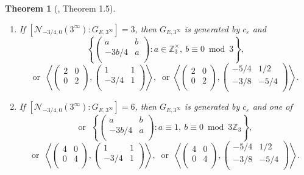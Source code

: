 \documentclass[11pt]{amsart}
\newtheorem{thm}[defn]{Theorem}
\theoremstyle{definition}
\newcommand{\Z}{\mathbb{Z}}
\begin{document}
\begin{thm}[\cite{lozano-galoiscm}, Theorem 1.5]
\begin{enumerate}
\begin{enumerate}
		\item[(ii)]  If $[\mathcal{N}_{-3/4,0}(3^\infty):G_{E,3^\infty}]=3$, then $G_{E,3^\infty}$ is generated by $c_{\varepsilon}$ and 
		\[ \left\{ \left(\begin{array}{cc} a & b\\ -3b/4 & a\\ \end{array}\right): a\in \Z_3^\times,\ b\equiv 0 \bmod 3 \right\}, \]
		\[ \text{or }\ \left\langle \left(\begin{array}{cc}  2 & 0\\ 0 & 2\\ \end{array}\right) ,\left(\begin{array}{cc}  1 & 1\\ -3/4 & 1\\ \end{array}\right)\right\rangle,\ \text{ or } \left\langle \left(\begin{array}{cc}  2 & 0\\ 0 & 2\\ \end{array}\right) ,\left(\begin{array}{cc}  -5/4 & 1/2\\ -3/8 & -5/4\\ \end{array}\right)\right\rangle. \] 
		\item[(iii)]  If $[\mathcal{N}_{-3/4,0}(3^\infty):G_{E,3^\infty}] = 6$, then $G_{E,3^\infty}$ is generated by $c_{\varepsilon}$ and one of
		\[  \text{or }\ \left\{ \left(\begin{array}{cc}  a & b\\ -3b/4 & a\\ \end{array}\right) : a\equiv 1,\ b\equiv 0 \bmod 3\Z_3 \right\}, \]
		\[ \text{or }\ \left\langle \left(\begin{array}{cc}  4 & 0\\ 0 & 4\\ \end{array}\right) ,\left(\begin{array}{cc}  1 & 1\\ -3/4 & 1\\ \end{array}\right)\right\rangle,\ \text{ or } \ \left\langle \left(\begin{array}{cc}  4 & 0\\ 0 & 4\\ \end{array}\right) ,\left(\begin{array}{cc}  -5/4 & 1/2\\ -3/8 & -5/4\\ \end{array}\right)\right\rangle. \]
		\end{enumerate}
	\end{enumerate}
\end{thm}
\end{document}
